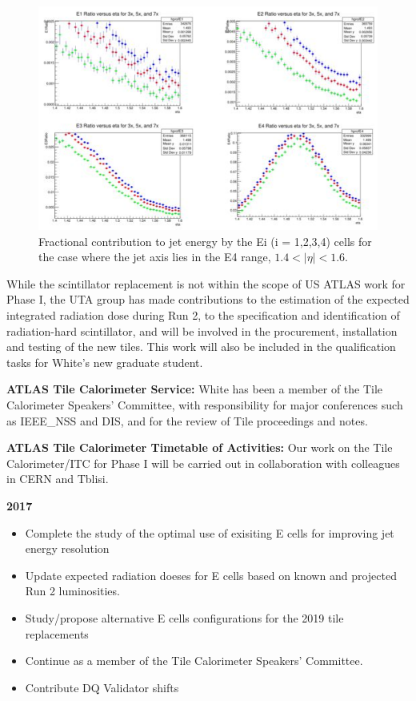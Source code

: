\begin{figure}[htb]
\centering
      \includegraphics[scale=0.6]{images/E4_Energy_ratios.jpg}

\caption{Fractional contribution to jet energy by the Ei (i = 1,2,3,4) cells for the case where the jet axis 
lies in the E4 range, $1.4 < |\eta| < 1.6$.}\label{fig:E4_Energy_ratios}
\end{figure}

While the scintillator replacement is not within the scope of US ATLAS work for Phase I, 
the UTA group has made contributions to the estimation of the expected integrated radiation dose during
Run 2, to the specification and identification of radiation-hard
scintillator, and will be involved in the procurement, installation and testing of the new
tiles. This work will also be included in the qualification tasks for White's new graduate student.

\textbf{ATLAS Tile Calorimeter Service:}
White has been a member of the Tile Calorimeter Speakers' Committee, with responsibility for major conferences such as IEEE\_NSS and DIS, and for the review of Tile proceedings and notes.

\textbf{ATLAS Tile Calorimeter Timetable of Activities:}
Our work on the Tile Calorimeter/ITC for Phase I will be carried out in collaboration with colleagues
in CERN and Tblisi.

\textbf{2017}
\begin{itemize}[noitemsep,nolistsep]
\item{Complete the study of the optimal use of exisiting E cells for improving jet energy resolution}
\item{Update expected radiation doeses for E cells based on known and projected Run 2 luminosities.}
\item{Study/propose alternative E cells configurations for the 2019 tile replacements}
\item{Continue as a member of the Tile Calorimeter Speakers' Committee.}
\item{Contribute DQ Validator shifts}
\end{itemize}

